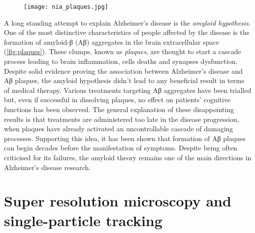 \begin{figure}
  \texttt{[image: nia\_plaques.jpg]}
\end{figure}

A long standing attempt to explain Alzheimer’s disease is the \emph{amyloid hypothesis}. One of the most distinctive characteristics of people affected by the disease is the formation of amyloid-β (Aβ) aggregates in the brain extracellular space (\cref{fig:plaques}).
These clumps, known as \emph{plaques}, are thought to start a cascade process leading to brain inflammation, cells deaths and synapses dysfunction. Despite solid evidence proving the association between Alzheimer's disease and Aβ plaques, the amyloid hypothesis didn't lead to any beneficial result in terms of medical therapy. Various treatments targeting Aβ aggregates have been trialled but, even if successful in dissolving plaques, no effect on patients' cognitive functions has been observed. The general explanation of these disappointing results is that treatments are administered too late in the disease progression, when plaques have already activated an uncontrollable cascade of damaging processes. Supporting this idea, it has been shown that formation of Aβ plaques can begin decades before the manifestation of symptoms. Despite being often criticised for its failures, the amyloid theory remains one of the main directions in Alzheimer's disease research.


\section{Super resolution microscopy and single-particle tracking}

